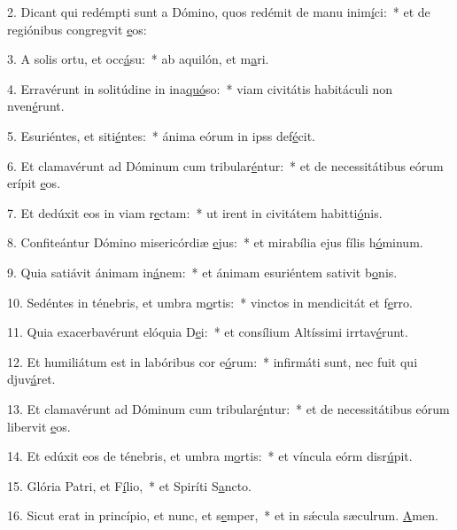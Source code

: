 2. Dicant qui redémpti sunt a Dómino, quos redémit de manu inim\uline{í}ci:~* et de regiónibus congregvit \uline{e}os:\par 
3. A solis ortu, et occ\uline{á}su:~* ab aquilón, et m\uline{a}ri.\par 
4. Erravérunt in solitúdine in ina\uline{quó}so:~* viam civitátis habitáculi non nven\uline{é}runt.\par 
5. Esuriéntes, et siti\uline{é}ntes:~* ánima eórum in ipss def\uline{é}cit.\par 
6. Et clamavérunt ad Dóminum cum tribular\uline{é}ntur:~* et de necessitátibus eórum erípit \uline{e}os.\par 
7. Et dedúxit eos in viam r\uline{e}ctam:~* ut irent in civitátem habitti\uline{ó}nis.\par 
8. Confiteántur Dómino misericórdiæ \uline{e}jus:~* et mirabília ejus fílis h\uline{ó}minum.\par 
9. Quia satiávit ánimam in\uline{á}nem:~* et ánimam esuriéntem sativit b\uline{o}nis.\par 
10. Sedéntes in ténebris, et umbra m\uline{o}rtis:~* vinctos in mendicitát et f\uline{e}rro.\par 
11. Quia exacerbavérunt elóquia D\uline{e}i:~* et consílium Altíssimi irrtav\uline{é}runt.\par 
12. Et humiliátum est in labóribus cor e\uline{ó}rum:~* infirmáti sunt, nec fuit qui djuv\uline{á}ret.\par 
13. Et clamavérunt ad Dóminum cum tribular\uline{é}ntur:~* et de necessitátibus eórum libervit \uline{e}os.\par 
14. Et edúxit eos de ténebris, et umbra m\uline{o}rtis:~* et víncula eórm disr\uline{ú}pit.\par 
15. Glória Patri, et F\uline{í}lio,~* et Spiríti S\uline{a}ncto.\par 
16. Sicut erat in princípio, et nunc, et s\uline{e}mper,~* et in sǽcula sæculrum. \uline{A}men.\par 
